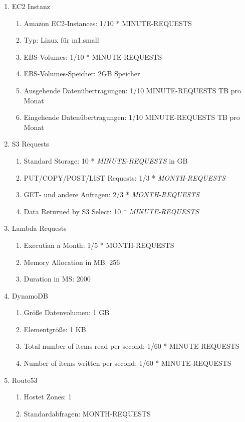 \documentclass[a4paper, 12pt]{scrreprt}
\renewcommand\_{\textunderscore\allowbreak}
\begin{document}
\begin{enumerate}
\item EC2 Instanz
\begin{enumerate}
\item Amazon EC2-Instances: 1/10 * MINUTE-REQUESTS
\item Typ: Linux für m1.small
\item EBS-Volumes: 1/10 * MINUTE-REQUESTS
\item EBS-Volumes-Speicher: 2GB Speicher
\item Ausgehende Datenübertragungen: 1/10 MINUTE-REQUESTS TB pro Monat
\item Eingehende Datenübertragungen: 1/10 MINUTE-REQUESTS TB pro Monat
\end{enumerate}
\item S3 Requests
\begin{enumerate}
\item Standard Storage: 10 * \textit{MINUTE-REQUESTS} in GB
\item PUT/COPY/POST/LIST Requests: 1/3 * \textit{MONTH-REQUESTS}
\item GET- und andere Anfragen: 2/3 * \textit{MONTH-REQUESTS}
\item Data Returned by S3 Select: 10 * \textit{MINUTE-REQUESTS}
\end{enumerate}
\item Lambda Requests
\begin{enumerate}
\item Executian a Month: 1/5 * MONTH-REQUESTS
\item Memory Allocation in MB: 256
\item Duration in MS: 2000
\end{enumerate}
\item DynamoDB
\begin{enumerate}
\item Größe Datenvolumen: 1 GB
\item Elementgröße: 1 KB
\item Total number of items read per second: 1/60 * MINUTE-REQUESTS
\item Number of items written per second: 1/60 * MINUTE-REQUESTS
\end{enumerate}
\item Route53
\begin{enumerate}
\item Hostet Zones: 1
\item Standardabfragen: MONTH-REQUESTS
\end{enumerate}
\end{enumerate}
\end{document}
